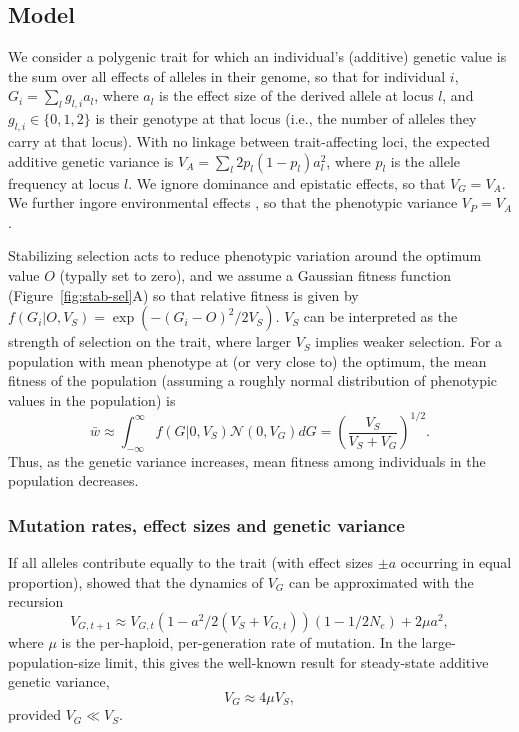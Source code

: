\documentclass{article}
\begin{document}
\subsection*{Model}

We consider a polygenic trait for which an individual's (additive) genetic
value is the sum over all effects of alleles in their genome, so that for
individual $i$, \(G_i = \sum_l g_{l, i} a_l\), where $a_l$ is the effect size
of the derived allele at locus $l$, and \(g_{l,i}\in\{0,1,2\}\) is their
genotype at that locus (i.e., the number of alleles they carry at that locus).
With no linkage between trait-affecting loci, the expected additive genetic
variance is \(V_A = \sum_l 2p_l(1-p_l)a_l^2\), where $p_l$ is the allele
frequency at locus $l$. We ignore dominance and epistatic effects, so that
\(V_G = V_A\).  We further ingore environmental effects
\citep{simons2018population}, so that the phenotypic variance \(V_P=V_A\).

Stabilizing selection acts to reduce phenotypic variation around the optimum
value $O$ (typally set to zero), and we assume a Gaussian fitness function
(Figure~\ref{fig:stab-sel}A) so that relative fitness is given by \(f(G_i | O,
V_S) = \exp{(-(G_i - O)^2 / 2 V_S)}\). $V_S$ can be interpreted as the strength
of selection on the trait, where larger $V_S$ implies weaker selection. For a
population with mean phenotype at (or very close to) the optimum, the mean
fitness of the population (assuming a roughly normal distribution of phenotypic
values in the population) is \[\bar{w} \approx \int_{-\infty}^\infty f(G | 0,
V_S) \mathcal{N}(0, V_G) dG = \left(\frac{V_S}{V_S+V_G}\right)^{1/2}.\] Thus,
as the genetic variance increases, mean fitness among individuals in the
population decreases.

\subsubsection*{Mutation rates, effect sizes and genetic variance}

If all alleles contribute equally to the trait
(with effect sizes \(\pm a\) occurring in equal proportion),
\citet{keightley1988quantitative} showed that the dynamics of $V_G$ can be
approximated with the recursion
\[V_{G,t+1} \approx V_{G,t}\left(1-a^2/2(V_S+V_{G,t})\right)
\left(1-1/2N_e\right) + 2 \mu a^2,\]
where $\mu$ is the per-haploid, per-generation rate of mutation. In the
large-population-size limit, this gives the well-known result for
steady-state additive genetic variance,
\[V_G \approx 4\mu V_S,\] provided \(V_G \ll V_S\).
\end{document}
